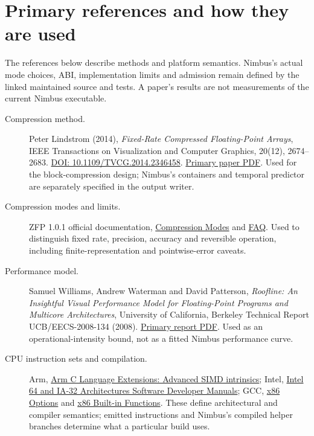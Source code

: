 \section{Primary references and how they are used}
\label{architecture-references}

The references below describe methods and platform semantics. Nimbus's actual
mode choices, ABI, implementation limits and admission remain defined by the
linked maintained source and tests. A paper's results are not measurements of
the current Nimbus executable.

\begin{description}
\item[Compression method.]
Peter Lindstrom (2014), \emph{Fixed-Rate Compressed Floating-Point Arrays},
IEEE Transactions on Visualization and Computer Graphics, 20(12), 2674--2683.
\href{https://doi.org/10.1109/TVCG.2014.2346458}{DOI: 10.1109/TVCG.2014.2346458}.
\href{https://vis.cs.ucdavis.edu/vis2014papers/TVCG/papers/2674_20tvcg12-lindstrom-2346458.pdf}{Primary paper PDF}.
Used for the block-compression design; Nimbus's containers and temporal
predictor are separately specified in the output writer.

\item[Compression modes and limits.]
ZFP 1.0.1 official documentation,
\href{https://zfp.readthedocs.io/en/release1.0.1/modes.html}{Compression Modes}
and \href{https://zfp.readthedocs.io/en/release1.0.1/faq.html}{FAQ}.
Used to distinguish fixed rate, precision, accuracy and reversible operation,
including finite-representation and pointwise-error caveats.

\item[Performance model.]
Samuel Williams, Andrew Waterman and David Patterson,
\emph{Roofline: An Insightful Visual Performance Model for Floating-Point
Programs and Multicore Architectures}, University of California, Berkeley
Technical Report UCB/EECS-2008-134 (2008).
\href{https://www2.eecs.berkeley.edu/Pubs/TechRpts/2008/EECS-2008-134.pdf}{Primary report PDF}.
Used as an operational-intensity bound, not as a fitted Nimbus performance curve.

\item[CPU instruction sets and compilation.]
Arm, \href{https://developer.arm.com/documentation/101028/0009/Advanced-SIMD--Neon--intrinsics}{Arm C Language Extensions: Advanced SIMD intrinsics};
Intel, \href{https://www.intel.com/content/www/us/en/developer/articles/technical/intel-sdm.html}{Intel 64 and IA-32 Architectures Software Developer Manuals};
GCC, \href{https://gcc.gnu.org/onlinedocs/gcc/x86-Options.html}{x86 Options}
and \href{https://gcc.gnu.org/onlinedocs/gcc/x86-Built-in-Functions.html}{x86 Built-in Functions}.
These define architectural and compiler semantics; emitted instructions and
Nimbus's compiled helper branches determine what a particular build uses.


\end{description}
